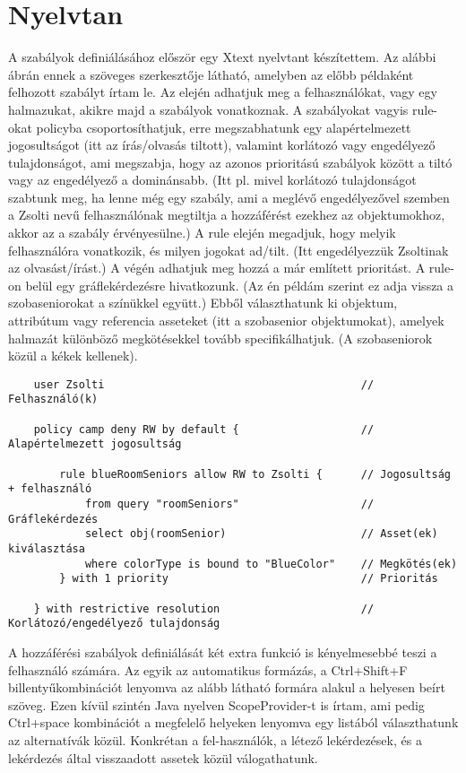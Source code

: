 \chapter{Nyelvtan}
A szabályok definiálásához először egy Xtext nyelvtant készítettem. Az alábbi ábrán ennek a szöveges szerkesztője látható, amelyben az előbb példaként felhozott szabályt írtam le. Az elején adhatjuk meg a felhasználókat, vagy egy halmazukat, akikre majd a szabályok vonatkoznak. A szabályokat vagyis rule-okat policyba csoportosíthatjuk, erre megszabhatunk egy alapértelmezett jogosultságot (itt az írás/olvasás tiltott), valamint korlátozó vagy engedélyező tulajdonságot, ami megszabja, hogy az azonos prioritású szabályok között a tiltó vagy az engedélyező a dominánsabb. (Itt pl. mivel korlátozó tulajdonságot szabtunk meg, ha lenne még egy szabály, ami a meglévő engedélyezővel szemben a Zsolti nevű felhasználónak megtiltja a hozzáférést ezekhez az objektumokhoz, akkor az a szabály érvényesülne.) A rule elején megadjuk, hogy melyik felhasználóra vonatkozik, és milyen jogokat ad/tilt. (Itt engedélyezzük Zsoltinak az olvasást/írást.) A végén adhatjuk meg hozzá a már említett prioritást. A rule-on belül egy gráflekérdezésre hivatkozunk. (Az én példám szerint ez adja vissza a szobaseniorokat a színükkel együtt.) Ebből választhatunk ki objektum, attribútum vagy referencia asseteket (itt a szobasenior objektumokat), amelyek halmazát különböző megkötésekkel tovább specifikálhatjuk. (A szobaseniorok közül a kékek kellenek).

\begin{lstlisting}
	user Zsolti                                        // Felhasználó(k)                 
	
	policy camp deny RW by default {                   // Alapértelmezett jogosultság
	
	    rule blueRoomSeniors allow RW to Zsolti {      // Jogosultság + felhasználó
	        from query "roomSeniors"                   // Gráflekérdezés
	        select obj(roomSenior)                     // Asset(ek) kiválasztása
	        where colorType is bound to "BlueColor"    // Megkötés(ek)
	    } with 1 priority                              // Prioritás
	
	} with restrictive resolution                      // Korlátozó/engedélyező tulajdonság
\end{lstlisting}

A hozzáférési szabályok definiálását két extra funkció is kényelmesebbé teszi a felhasználó számára. Az egyik az automatikus formázás, a Ctrl+Shift+F billentyűkombinációt lenyomva az alább látható formára alakul a helyesen beírt szöveg. Ezen kívül szintén Java nyelven ScopeProvider-t is írtam, ami pedig Ctrl+space kombinációt a megfelelő helyeken lenyomva egy listából választhatunk az alternatívák közül. Konkrétan a fel-használók, a létező lekérdezések, és a lekérdezés által visszaadott assetek közül válogathatunk.
